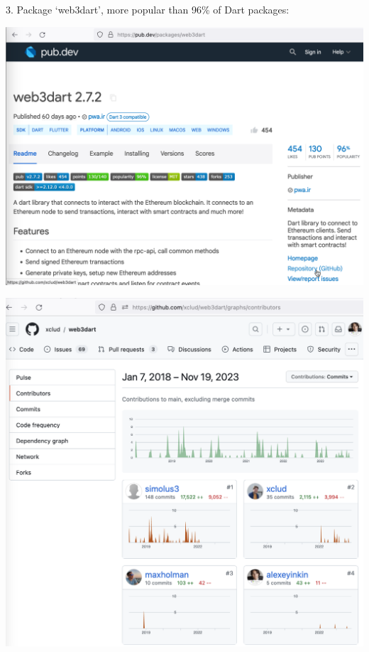 3. Package `web3dart', more popular than 96\% of Dart packages:

\begin{center}
    \includegraphics[width=\textwidth]{web3dart}
\end{center}
\begin{center}
    \includegraphics[width=\textwidth]{web3dart_contributors}
\end{center}
\pagebreak

\pagebreak
